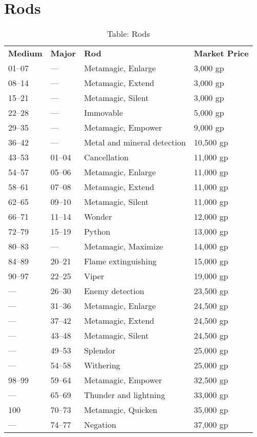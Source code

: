 \section{Rods}

\label{f0}
\begin{table}[]
\sffamily
\caption{Table: Rods}
\begin{tabular}{llll}
\textbf{Medium} & \textbf{Major} & \textbf{Rod} & \textbf{Market Price}\\
01–07 & — & Metamagic, Enlarge & 3,000 gp \\
 08–14 & — & Metamagic, Extend & 3,000 gp \\
 15–21 & — & Metamagic, Silent & 3,000 gp \\
 22–28 & — & Immovable & 5,000 gp \\
 29–35 & — & Metamagic, Empower & 9,000 gp \\
 36–42 & — & Metal and mineral detection & 10,500 gp \\
 43–53 & 01–04 & Cancellation & 11,000 gp \\
 54–57 & 05–06 & Metamagic, Enlarge & 11,000 gp \\
 58–61 & 07–08 & Metamagic, Extend & 11,000 gp \\
 62–65 & 09–10 & Metamagic, Silent & 11,000 gp \\
 66–71 & 11–14 & Wonder & 12,000 gp \\
 72–79 & 15–19 & Python & 13,000 gp \\
 80–83 & — & Metamagic, Maximize & 14,000 gp \\
 84–89 & 20–21 & Flame extinguishing & 15,000 gp \\
 90–97 & 22–25 & Viper & 19,000 gp \\
 — & 26–30 & Enemy detection & 23,500 gp \\
 — & 31–36 & Metamagic, Enlarge & 24,500 gp \\
 — & 37–42 & Metamagic, Extend & 24,500 gp \\
 — & 43–48 & Metamagic, Silent & 24,500 gp \\
 — & 49–53 & Splendor & 25,000 gp \\
 — & 54–58 & Withering & 25,000 gp \\
 98–99 & 59–64 & Metamagic, Empower & 32,500 gp \\
 — & 65–69 & Thunder and lightning & 33,000 gp \\
 100 & 70–73 & Metamagic, Quicken & 35,000 gp \\
 — & 74–77 & Negation & 37,000 gp \\

\end{tabular}
\end{table}
